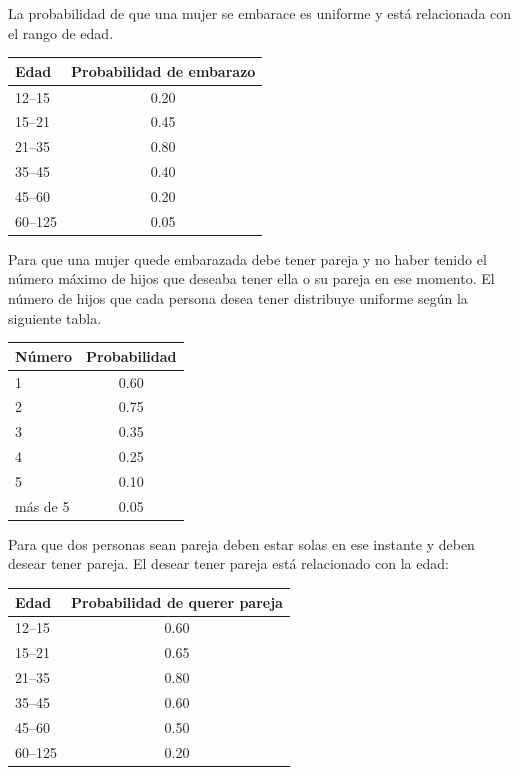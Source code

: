 \documentclass[12pt,a4paper]{article}
\begin{document}
La probabilidad de que una mujer se embarace es uniforme y está relacionada con el rango de edad.

\begin{center}
\begin{tabular}{lc}
\toprule
\textbf{Edad} & \textbf{Probabilidad de embarazo} \\
\midrule
12--15  & 0.20 \\
15--21  & 0.45 \\
21--35  & 0.80 \\
35--45  & 0.40 \\
45--60  & 0.20 \\
60--125 & 0.05 \\
\bottomrule
\end{tabular}
\end{center}


Para que una mujer quede embarazada debe tener pareja y no haber tenido el número máximo de hijos que deseaba tener ella o su pareja en ese momento. El número de hijos que cada persona desea tener distribuye uniforme según la siguiente tabla.

\begin{center}
\begin{tabular}{lc}
\toprule
\textbf{Número} & \textbf{Probabilidad} \\
\midrule
1        & 0.60 \\
2        & 0.75 \\
3        & 0.35 \\
4        & 0.25 \\
5        & 0.10 \\
más de 5 & 0.05 \\
\bottomrule
\end{tabular}
\end{center}



Para que dos personas sean pareja deben estar solas en ese instante y deben desear tener pareja. El desear tener pareja está relacionado con la edad:

\begin{center}
\begin{tabular}{lc}
\toprule
\textbf{Edad} & \textbf{Probabilidad de querer pareja} \\
\midrule
12--15  & 0.60 \\
15--21  & 0.65 \\
21--35  & 0.80 \\
35--45  & 0.60 \\
45--60  & 0.50 \\
60--125 & 0.20 \\
\bottomrule
\end{tabular}
\end{center}
\end{document}
